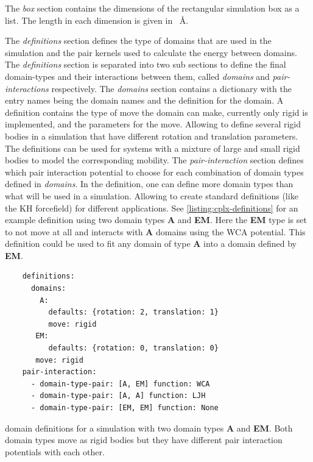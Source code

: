 \documentclass[12pt, twoside]{report}
\begin{document}
The \textit{box} section contains the dimensions of the rectangular simulation
box as a \yaml list. The length in each dimension is given in \SI{}{\AA}.

The \textit{definitions} section defines the type of domains that are used in
the simulation and the pair kernels used to calculate the energy between
domains. The \textit{definitions} section is separated into two sub sections to
define the final domain-types and their interactions between them, called
\textit{domains} and \textit{pair-interactions} respectively. The
\textit{domains} section contains a dictionary with the entry names being the
domain names and the definition for the domain. A definition contains the type
of move the domain can make, currently only rigid is implemented, and the parameters for
the move. Allowing to define several rigid bodies in a simulation that have
different rotation and translation parameters. The definitions can be used for
systems with a mixture of large and small rigid bodies to model the
corresponding mobility. The \textit{pair-interaction} section defines which pair
interaction potential to choose for each combination of domain types defined in
\textit{domains}. In the definition, one can define more domain types than what
will be used in a simulation. Allowing to create standard definitions (like the
\gls{KH} forcefield) for different applications. See
\cref{listing:cplx-definitions} for an example definition using two domain types
\textbf{A} and \textbf{EM}. Here the \textbf{EM} type is set to not move at all
and interacts with \textbf{A} domains using the \gls{WCA} potential. This
definition could be used to fit any domain of type \textbf{A} into a domain
defined by \textbf{EM}.
\begin{listing}[!ht]
  \begin{verbatim}
    definitions:
      domains:
        A:
          defaults: {rotation: 2, translation: 1}
          move: rigid
       EM:
          defaults: {rotation: 0, translation: 0}
       move: rigid
    pair-interaction:
      - domain-type-pair: [A, EM] function: WCA
      - domain-type-pair: [A, A] function: LJH
      - domain-type-pair: [EM, EM] function: None
\end{verbatim}
\caption{\complexes domain definitions for a simulation with two domain types
\textbf{A} and \textbf{EM}. Both domain types move as rigid bodies but they have
different pair interaction potentials with each other.}
\label{listing:cplx-definitions}
\end{listing}
\end{document}
